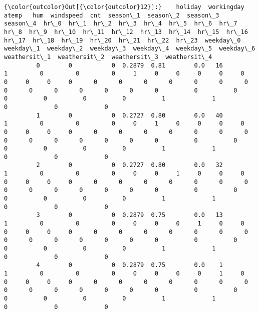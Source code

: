 \documentclass[11pt]{article}
\begin{document}
\begin{Verbatim}[commandchars=\\\{\}]
{\color{outcolor}Out[{\color{outcolor}12}]:}    holiday  workingday   atemp   hum  windspeed  cnt  season\_1  season\_2  season\_3  season\_4  hr\_0  hr\_1  hr\_2  hr\_3  hr\_4  hr\_5  hr\_6  hr\_7  hr\_8  hr\_9  hr\_10  hr\_11  hr\_12  hr\_13  hr\_14  hr\_15  hr\_16  hr\_17  hr\_18  hr\_19  hr\_20  hr\_21  hr\_22  hr\_23  weekday\_0  weekday\_1  weekday\_2  weekday\_3  weekday\_4  weekday\_5  weekday\_6  weathersit\_1  weathersit\_2  weathersit\_3  weathersit\_4
         0        0           0  0.2879  0.81        0.0   16         1         0         0         0     1     0     0     0     0     0     0     0     0     0      0      0      0      0      0      0      0      0      0      0      0      0      0      0          0          0          0          0          0          0          1             1             0             0             0
         1        0           0  0.2727  0.80        0.0   40         1         0         0         0     0     1     0     0     0     0     0     0     0     0      0      0      0      0      0      0      0      0      0      0      0      0      0      0          0          0          0          0          0          0          1             1             0             0             0
         2        0           0  0.2727  0.80        0.0   32         1         0         0         0     0     0     1     0     0     0     0     0     0     0      0      0      0      0      0      0      0      0      0      0      0      0      0      0          0          0          0          0          0          0          1             1             0             0             0
         3        0           0  0.2879  0.75        0.0   13         1         0         0         0     0     0     0     1     0     0     0     0     0     0      0      0      0      0      0      0      0      0      0      0      0      0      0      0          0          0          0          0          0          0          1             1             0             0             0
         4        0           0  0.2879  0.75        0.0    1         1         0         0         0     0     0     0     0     1     0     0     0     0     0      0      0      0      0      0      0      0      0      0      0      0      0      0      0          0          0          0          0          0          0          1             1             0             0             0
\end{Verbatim}
            
\end{document}
